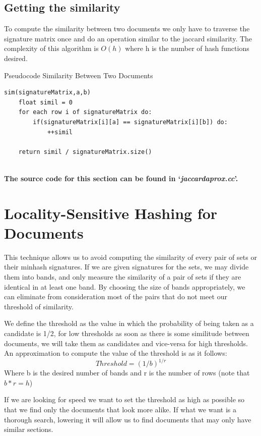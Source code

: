 \documentclass[12pt]{article}
\begin{document}
\subsection{Getting the similarity}
To compute the similarity between two documents we only have to traverse the signature matrix once and do an operation similar to the jaccard similarity. The complexity of this algorithm is $O(h)$ where h is the number of hash functions desired.
\begin{center}
\begin{large}
Pseudocode Similarity Between Two Documents
\end{large}
\end{center}
\begin{lstlisting}
sim(signatureMatrix,a,b)
    float simil = 0
    for each row i of signatureMatrix do:
        if(signatureMatrix[i][a] == signatureMatrix[i][b]) do:
        	++simil
 
    return simil / signatureMatrix.size()


\end{lstlisting}

\bigskip
\textbf{The source code for this section can be found in `\textit{jaccardaprox.cc}'.}

\section{Locality-Sensitive Hashing for Documents}
 This technique allows us to avoid computing the similarity of every pair of sets or their minhash signatures. If we are given signatures for the sets, we may divide them into bands, and only measure the similarity of a pair of sets if they are identical in at least one band. By choosing the size of bands appropriately, we can eliminate from consideration most of the pairs that do not meet our threshold of similarity.
 
 \bigskip
 We define the threshold as the value in which the probability of being taken as a candidate is 1/2, for low thresholds as soon as there is some similitude between documents, we will take them as candidates and vice-versa for high thresholds. An approximation to compute the value of the threshold is as it follows:
 $$Threshold = (1/b)^{1/r}$$
 Where b is the desired number of bands and r is the number of rows (note that $b*r = h$)
 
 \bigskip
If we are looking for speed we want to set the threshold as high as possible so that we find only the documents that look more alike. If what we want is a thorough search, lowering it will allow us to find documents that may only have similar sections.
\medskip 
 
\end{document}
